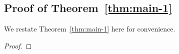 \documentclass[11pt]{article}
\newcommand{\ceil}[1]{\left\lceil #1 \right\rceil}
\newcommand{\eps}{\varepsilon}
\newcommand{\numrounds}{t}
\newcommand{\covproba}{\gamma}
\newcommand{\numrows}{r}
\newcommand{\threshold}{\tau}
\theoremstyle{remark}
\begin{document}
\subsection{Proof of Theorem~\ref{thm:main-1}}

We restate Theorem~\ref{thm:main-1} here for convenience.
\approxcg*
\begin{proof}
    
    

\end{proof}
\end{document}
